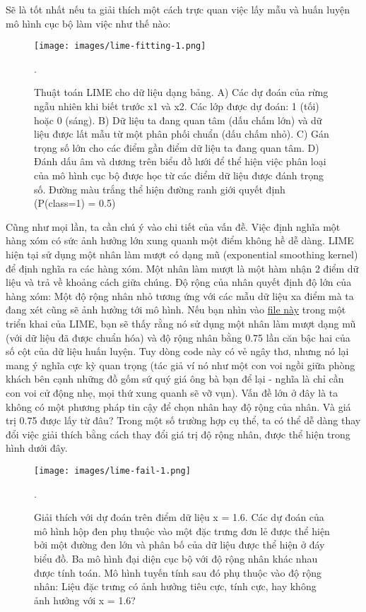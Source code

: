 Sẽ là tốt nhất nếu ta giải thích một cách trực quan việc lấy mẫu và huấn luyện mô hình cục bộ làm việc như thế nào:

\begin{figure*}[h!]
	\centering
	\texttt{[image: images/lime-fitting-1.png]}
	\label{fig:5_33}
	\caption{Thuật toán LIME cho dữ liệu dạng bảng. A) Các dự đoán của rừng ngẫu nhiên khi biết trước x1 và x2. Các lớp được dự đoán: 1 (tối) hoặc 0 (sáng). B) Dữ liệu ta đang quan tâm (dấu chấm lớn) và dữ liệu được lất mẫu từ một phân phối chuẩn (dấu chấm nhỏ). C) Gán trọng số lớn cho các điểm gần điểm dữ liệu ta đang quan tâm. D) Đánh dấu âm và dương trên biểu đồ lưới để thể hiện việc phân loại của mô hình cục bộ được học từ các điểm dữ liệu được đánh trọng số. Đường màu trắng thể hiện đường ranh giới quyết định (P(class=1) = 0.5)}.
	
\end{figure*}

Cũng như mọi lần, ta cần chú ý vào chi tiết của vấn đề. Việc định nghĩa một hàng xóm có sức ảnh hưởng lớn xung quanh một điểm không hề dễ dàng. LIME hiện tại sử dụng một nhân làm mượt có dạng mũ (exponential smoothing kernel) để định nghĩa ra các hàng xóm. Một nhân làm mượt là một hàm nhận 2 điểm dữ liệu và trả về khoảng cách giữa chúng. Độ rộng của nhân quyết định độ lớn của hàng xóm: Một độ rộng nhân nhỏ tương ứng với các mẫu dữ liệu xa điểm mà ta đang xét cũng sẽ ảnh hưởng tới mô hình. Nếu bạn nhìn vào \href{https://github.com/marcotcr/lime/tree/ce2db6f20f47c3330beb107bb17fd25840ca4606}{file này} trong một triển khai của LIME, bạn sẽ thấy rằng nó sử dụng một nhân làm mượt dạng mũ (với dữ liệu đã được chuẩn hóa) và độ rộng nhân bằng 0.75 lần căn bậc hai của số cột của dữ liệu huấn luyện. Tuy dòng code này có vẻ ngây thơ, nhưng nó lại mang ý nghĩa cực kỳ quan trọng (tác giả ví nó như một con voi ngồi giữa phòng khách bên cạnh những đồ gốm sứ quý giá ông bà bạn để lại - nghĩa là chỉ cần con voi cử động nhẹ, mọi thứ xung quanh sẽ vỡ vụn). Vấn đề lớn ở đây là ta không có một phương pháp tin cậy để chọn nhân hay độ rộng của nhân. Và giá trị 0.75 được lấy từ đâu? Trong một số trường hợp cụ thể, ta có thể dễ dàng thay đổi việc giải thích bằng cách thay đổi giá trị độ rộng nhân, được thể hiện trong hình dưới đây.

\begin{figure*}[h!]
	\centering
	\texttt{[image: images/lime-fail-1.png]}
	\label{fig:5_34}
	\caption{Giải thích với dự đoán trên điểm dữ liệu x = 1.6. Các dự đoán của mô hình hộp đen phụ thuộc vào một đặc trưng đơn lẻ được thể hiện bởi một đường đen lớn và phân bố của dữ liệu được thể hiện ở đáy biểu đồ. Ba mô hình đại diện cục bộ với độ rộng nhân khác nhau được tính toán. Mô hình tuyến tính sau đó phụ thuộc vào độ rộng nhân: Liệu đặc trưng có ảnh hưởng tiêu cực, tính cực, hay không ảnh hưởng với x = 1.6?}.
	
\end{figure*}

